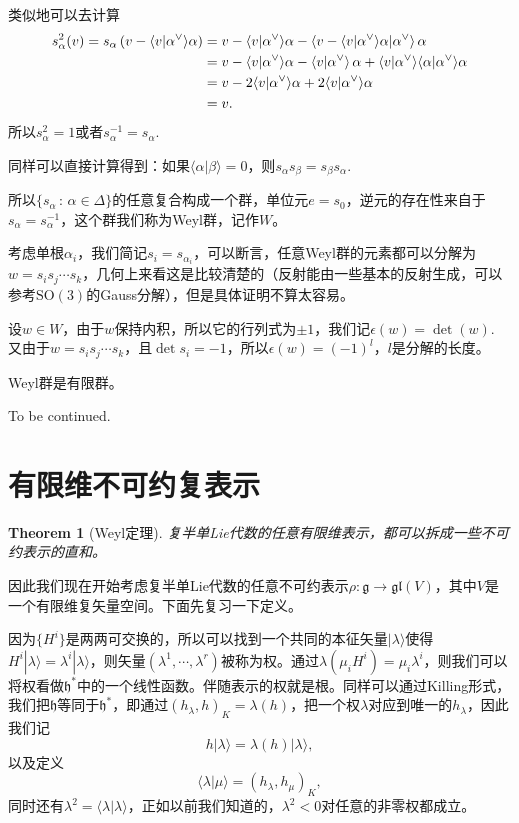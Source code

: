 \documentclass[11pt]{article}
\theoremstyle{definition}
\theoremstyle{plain}
\newtheorem{thm}[para]{Theorem}
\newcommand{\lag}{{\mathfrak{g}}}
\begin{document}
\para 类似地可以去计算
\begin{align*}
	s_\alpha^2(v)=s_\alpha\left(v-\langle v|\alpha^\vee\rangle\alpha\right)&=v-\langle v|\alpha^\vee\rangle\alpha-\left\langle v-\langle v|\alpha^\vee\rangle\alpha\large|\alpha^\vee\right\rangle\alpha\\
	&=v-\langle v|\alpha^\vee\rangle\alpha-\left\langle v\large|\alpha^\vee\right\rangle\alpha+\langle v|\alpha^\vee\rangle\langle\alpha|\alpha^\vee\rangle\alpha\\
	&=v-2\langle v|\alpha^\vee\rangle\alpha+2\langle v|\alpha^\vee\rangle\alpha\\
	&=v.
\end{align*}
所以$s_\alpha^2=1$或者$s_\alpha^{-1}=s_\alpha$.

同样可以直接计算得到：如果$\langle \alpha|\beta\rangle=0$，则$s_\alpha s_\beta=s_\beta s_\alpha$.

\para 所以$\{s_\alpha\,:\, \alpha\in \Delta\}$的任意复合构成一个群，单位元$e=s_0$，逆元的存在性来自于$s_\alpha=s_\alpha^{-1}$，这个群我们称为Weyl群，记作$W$。

考虑单根$\alpha_i$，我们简记$s_i=s_{\alpha_i}$，可以断言，任意Weyl群的元素都可以分解为$w=s_is_j\cdots s_k$，几何上来看这是比较清楚的（反射能由一些基本的反射生成，可以参考$\mathrm{SO}(3)$的Gauss分解），但是具体证明不算太容易。

\para 设$w\in W$，由于$w$保持内积，所以它的行列式为$\pm 1$，我们记$\epsilon(w)=\det(w)$. 又由于$w=s_is_j\cdots s_k$，且$\det s_i=-1$，所以$\epsilon(w)=(-1)^l$，$l$是分解的长度。

{\pro Weyl群是有限群。\endpro}

To be continued.

\section{有限维不可约复表示}

\begin{thm}[Weyl定理]
复半单Lie代数的任意有限维表示，都可以拆成一些不可约表示的直和。
\end{thm}

因此我们现在开始考虑复半单Lie代数的任意不可约表示$\rho:\lag\to \mathfrak{gl}(V)$，其中$V$是一个有限维复矢量空间。下面先复习一下定义。

\para 因为$\{H^i\}$是两两可交换的，所以可以找到一个共同的本征矢量$|\lambda\rangle$使得$H^i|\lambda\rangle=\lambda^i|\lambda\rangle$，则矢量$(\lambda^1,\cdots,\lambda^r)$被称为权。通过$\lambda(\mu_iH^i)=\mu_i\lambda^i$，则我们可以将权看做$\mathfrak{h}^*$中的一个线性函数。伴随表示的权就是根。同样可以通过Killing形式，我们把$\mathfrak{h}$等同于$\mathfrak{h}^*$，即通过$(h_\lambda,h)_K=\lambda(h)$，把一个权$\lambda$对应到唯一的$h_\lambda$，因此我们记
\[
	h|\lambda\rangle=\lambda(h)|\lambda\rangle,
\]
以及定义
\[
	\langle \lambda|\mu\rangle=(h_\lambda,h_\mu)_K,
\]
同时还有$\lambda^2=\langle \lambda|\lambda\rangle$，正如以前我们知道的，$\lambda^2<0$对任意的非零权都成立。
\end{document}
